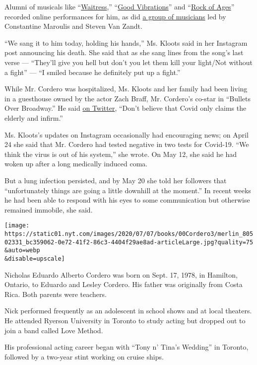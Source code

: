 Alumni of musicals like
``\href{https://youtu.be/RIkV4s3ubj8}{Waitress},''
``\href{https://www.instagram.com/tv/B_gkSkHngdb/?igshid=12rkjeumeagpk}{Good
Vibrations}'' and
``\href{https://www.facebook.com/jonquesenberry/videos/10160469098802524/?t=2}{Rock
of Ages}'' recorded online performances for him, as did
\href{https://youtu.be/-mVKcSmaHbI}{a group of musicians} led by
Constantine Maroulis and Steven Van Zandt.

``We sang it to him today, holding his hands,'' Ms. Kloots said in her
Instagram post announcing his death. She said that as she sang lines
from the song's last verse --- ``They'll give you hell but don't you let
them kill your light/Not without a fight'' --- ``I smiled because he
definitely put up a fight.''

While Mr. Cordero was hospitalized, Ms. Kloots and her family had been
living in a guesthouse owned by the actor Zach Braff, Mr. Cordero's
co-star in ``Bullets Over Broadway.'' He said
\href{https://twitter.com/zachbraff/status/1279961237342674944}{on
Twitter}, ``Don't believe that Covid only claims the elderly and
infirm.''

Ms. Kloots's updates on Instagram occasionally had encouraging news; on
April 24 she said that Mr. Cordero had tested negative in two tests for
Covid-19. ``We think the virus is out of his system,'' she wrote. On May
12, she said he had woken up after a long medically induced coma.

But a lung infection persisted, and by May 20 she told her followers
that ``unfortunately things are going a little downhill at the moment.''
In recent weeks he had been able to respond with his eyes to some
communication but otherwise remained immobile, she said.

\texttt{[image: https://static01.nyt.com/images/2020/07/07/books/00Cordero3/merlin\_80502331\_bc359062-0e72-41f2-86c3-4404f29ae8ad-articleLarge.jpg?quality=75\\\&auto=webp\\\&disable=upscale]}

Nicholas Eduardo Alberto Cordero was born on Sept. 17, 1978, in
Hamilton, Ontario, to Eduardo and Lesley Cordero. His father was
originally from Costa Rica. Both parents were teachers.

Nick performed frequently as an adolescent in school shows and at local
theaters. He attended Ryerson University in Toronto to study acting but
dropped out to join a band called Love Method.

His professional acting career began with ``Tony n' Tina's Wedding'' in
Toronto, followed by a two-year stint working on cruise ships.

